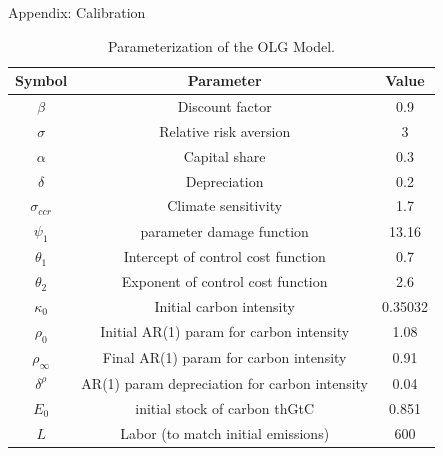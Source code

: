 \documentclass[10pt,aspectratio=169]{beamer}
\begin{document}
\begin{frame}[fragile]{Appendix: Calibration}
\begin{table}[]
    \centering
    \small
    \begin{tabular}{ccc}
    \hline \hline
  \textbf{Symbol} & \textbf{Parameter} & \textbf{Value} \\
    \hline
    $\beta$  & Discount factor& 0.9 \\
    $\sigma$  & Relative risk aversion & 3 \\
    $\alpha$  & Capital share & 0.3 \\
    $\delta$  &Depreciation & 0.2 \\
    $\sigma_{ccr}$  & Climate sensitivity & 1.7 \\
    $\psi_1$  & parameter damage function & 13.16 \\
    $\theta_1$  & Intercept of control cost function & 0.7 \\
    $\theta_2$  & Exponent of control cost function & 2.6 \\
    $\kappa_{0}$  & Initial carbon intensity & 0.35032 \\
    $\rho_0$  & Initial AR(1) param for carbon intensity & 1.08 \\
    $\rho_{\infty}$  & Final AR(1) param for carbon intensity & 0.91 \\
    $\delta^{\rho}$  & AR(1) param depreciation for carbon intensity  & 0.04 \\
    $E_0$ & initial stock of carbon thGtC& 0.851 \\
    $L$ & Labor (to match initial emissions) & 600 \\
    \hline
\end{tabular}
    \caption{Parameterization of the OLG Model.}
    \label{tab:parameters}
\end{table}
\end{frame}
\end{document}
